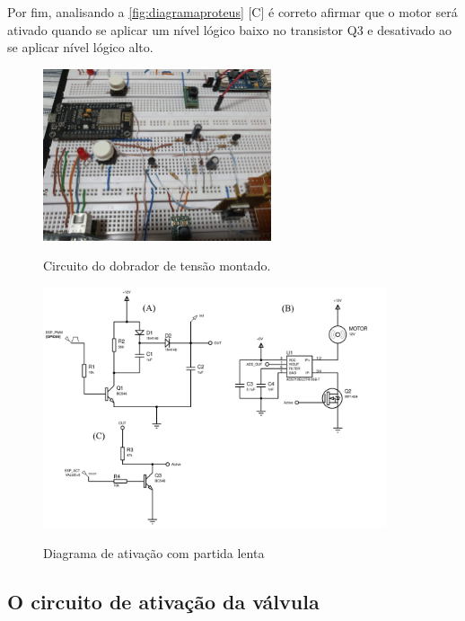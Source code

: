 Por fim, analisando a \autoref{fig:diagramaproteus} [C] é correto afirmar que o motor será ativado quando se aplicar um nível lógico baixo no transistor Q3 e desativado ao se aplicar nível lógico alto.

\begin{figure}[H]
	\centering
	\caption{Circuito do dobrador de tensão montado.}
	\includegraphics[width=0.6\textwidth]{figuras/dobrador_montado.jpg}
	\label{fig:dobrador_montado}
\end{figure} 



\begin{figure}[H]
	\centering
	\caption{Diagrama de ativação com partida lenta}
	\includegraphics[width=0.9\textwidth]{figuras/diagrama_ativação_bomba.png}
	\label{fig:diagramaproteus}
\end{figure} 



\subsection{O circuito de ativação da válvula}


